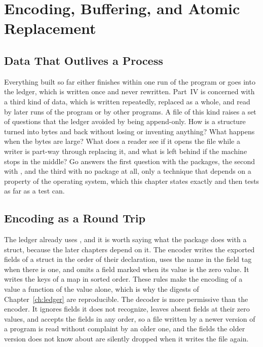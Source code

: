 \chapter{Encoding, Buffering, and Atomic Replacement}
\label{ch:encoding}

\section{Data That Outlives a Process}

Everything built so far either finishes within one run of the program or goes into the ledger, which is written once and never rewritten. Part~IV is concerned with a third kind of data, which is written repeatedly, replaced as a whole, and read by later runs of the program or by other programs. A file of this kind raises a set of questions that the ledger avoided by being append-only. How is a structure turned into bytes and back without losing or inventing anything? What happens when the bytes are large? What does a reader see if it opens the file while a writer is part-way through replacing it, and what is left behind if the machine stops in the middle? Go answers the first question with the  packages, the second with , and the third with no package at all, only a technique that depends on a property of the operating system, which this chapter states exactly and then tests as far as a test can.

\section{Encoding as a Round Trip}

The ledger already uses , and it is worth saying what the package does with a struct, because the later chapters depend on it. The encoder writes the exported fields of a struct in the order of their declaration, uses the name in the field tag when there is one, and omits a field marked  when its value is the zero value. It writes the keys of a map in sorted order. These rules make the encoding of a value a function of the value alone, which is why the digests of Chapter~\ref{ch:ledger} are reproducible. The decoder is more permissive than the encoder. It ignores fields it does not recognize, leaves absent fields at their zero values, and accepts the fields in any order, so a file written by a newer version of a program is read without complaint by an older one, and the fields the older version does not know about are silently dropped when it writes the file again.

